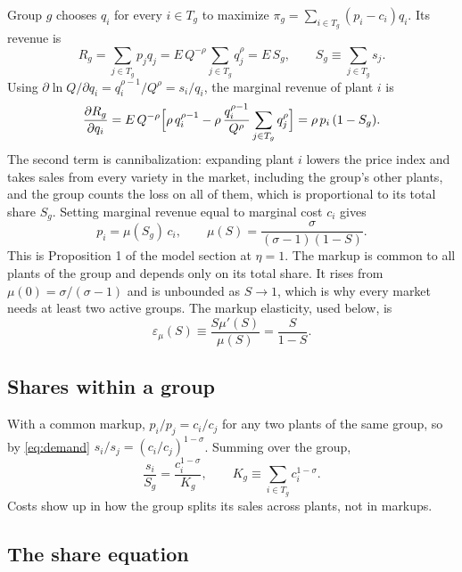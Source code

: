 \documentclass[11pt]{article}
\theoremstyle{remark}
\begin{document}
Group $g$ chooses $q_i$ for every $i\in T_g$ to maximize
$\pi_g=\sum_{i\in T_g}(p_i-c_i)q_i$. Its revenue is
\[
  R_g=\sum_{j\in T_g}p_jq_j=E\,Q^{-\rho}\sum_{j\in T_g}q_j^\rho=E\,S_g,
  \qquad
  S_g\equiv\sum_{j\in T_g}s_j .
\]
Using $\partial\ln Q/\partial q_i=q_i^{\rho-1}/Q^\rho=s_i/q_i$, the marginal revenue of
plant $i$ is
\[
  \frac{\partial R_g}{\partial q_i}
  =E\,Q^{-\rho}\Bigl[\rho\,q_i^{\rho-1}-\rho\,\frac{q_i^{\rho-1}}{Q^\rho}\sum_{j\in T_g}q_j^\rho\Bigr]
  =\rho\,p_i\,(1-S_g).
\]
The second term is cannibalization: expanding plant $i$ lowers the price index and
takes sales from every variety in the market, including the group's other plants, and
the group counts the loss on all of them, which is proportional to its total share
$S_g$. Setting marginal revenue equal to marginal cost $c_i$ gives
\begin{equation}
  p_i=\mu(S_g)\,c_i,
  \qquad
  \mu(S)=\frac{\sigma}{(\sigma-1)(1-S)} .
  \label{eq:markup}
\end{equation}
This is Proposition 1 of the model section at $\eta=1$. The markup is common to all
plants of the group and depends only on its total share. It rises from
$\mu(0)=\sigma/(\sigma-1)$ and is unbounded as $S\to1$, which is why every market needs
at least two active groups. The markup elasticity, used below, is
\begin{equation}
  \varepsilon_\mu(S)\equiv\frac{S\mu'(S)}{\mu(S)}=\frac{S}{1-S} .
  \label{eq:epsmu}
\end{equation}

\subsection{Shares within a group}

With a common markup, $p_i/p_j=c_i/c_j$ for any two plants of the same group, so by
\eqref{eq:demand} $s_i/s_j=(c_i/c_j)^{1-\sigma}$. Summing over the group,
\begin{equation}
  \frac{s_i}{S_g}=\frac{c_i^{1-\sigma}}{K_g},
  \qquad
  K_g\equiv\sum_{i\in T_g}c_i^{1-\sigma}.
  \label{eq:withingroup}
\end{equation}
Costs show up in how the group splits its sales across plants, not in markups.

\subsection{The share equation}
\end{document}
